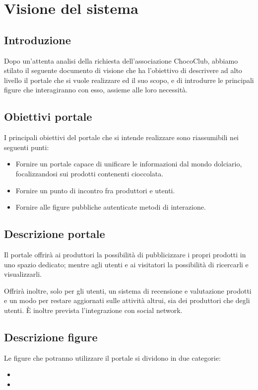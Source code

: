 \chapter{Visione del sistema} 
\label{cha:documento_di_visione}

\section{Introduzione}
Dopo un'attenta analisi della richiesta dell'associazione ChocoClub, abbiamo stilato il seguente documento di visione che ha l'obiettivo di descrivere ad alto livello il portale che si vuole realizzare ed il suo scopo, e di introdurre le principali figure che interagiranno con esso, assieme alle loro necessità.

\section{Obiettivi portale} 
\label{sec:obiettivi_portale}
I principali obiettivi del portale che si intende realizzare sono riassumibili nei seguenti punti:
\begin{itemize}
	\item Fornire un portale capace di unificare le informazioni dal mondo dolciario, focalizzandosi sui prodotti contenenti cioccolata.
	\item Fornire un punto di incontro fra produttori e utenti.
	\item Fornire alle figure pubbliche autenticate metodi di interazione.
\end{itemize}

\section{Descrizione portale}
\label{sec:descrizione_portale}
Il portale offrirà ai produttori la possibilità di pubblicizzare i propri prodotti in uno spazio dedicato; mentre agli utenti e ai visitatori la possibilità di ricercarli e visualizzarli. 

Offrirà inoltre, solo per gli utenti, un sistema di recensione e valutazione prodotti e un modo per restare aggiornati sulle attività altrui, sia dei produttori che degli utenti.
È inoltre prevista l'integrazione con social network.

\section{Descrizione figure} 
\label{sec:descrizione_figure}
Le figure che potranno utilizzare il portale si dividono in due categorie:
\begin{itemize}
	\item {}
	\item {}
\end{itemize}

